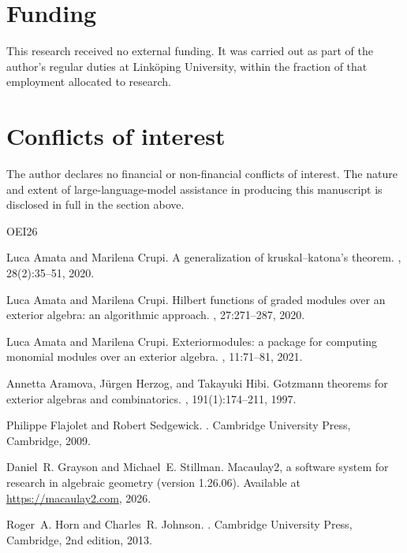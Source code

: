 \documentclass[11pt, a4paper, abstract=yes]{scrartcl}
\theoremstyle{definition}
\theoremstyle{remark}
\theoremstyle{plain}
\begin{document}
\section*{Funding}
\label{sec:orgbf03d5f}
This research received no external funding. It was carried out as part of the author's regular duties
at Linköping University, within the fraction of that employment allocated to research.
\section*{Conflicts of interest}
\label{sec:orgd28a2cf}
The author declares no financial or non-financial conflicts of interest. The nature and extent of
large-language-model assistance in producing this manuscript is disclosed in full in the section
above.
\begin{thebibliography}{{OEI}26}

Luca Amata and Marilena Crupi.
\newblock A generalization of kruskal--katona's theorem.
, 28(2):35--51, 2020.

Luca Amata and Marilena Crupi.
\newblock Hilbert functions of graded modules over an exterior algebra: an
  algorithmic approach.
, 27:271--287, 2020.

Luca Amata and Marilena Crupi.
\newblock Exteriormodules: a package for computing monomial modules over an
  exterior algebra.
, 11:71--81, 2021.

Annetta Aramova, J{\"u}rgen Herzog, and Takayuki Hibi.
\newblock Gotzmann theorems for exterior algebras and combinatorics.
, 191(1):174--211, 1997.

Philippe Flajolet and Robert Sedgewick.
.
\newblock Cambridge University Press, Cambridge, 2009.

Daniel~R. Grayson and Michael~E. Stillman.
\newblock Macaulay2, a software system for research in algebraic geometry
  (version 1.26.06).
\newblock Available at \url{https://macaulay2.com}, 2026.

Roger~A. Horn and Charles~R. Johnson.
.
\newblock Cambridge University Press, Cambridge, 2nd edition, 2013.


\end{thebibliography}
\end{document}
